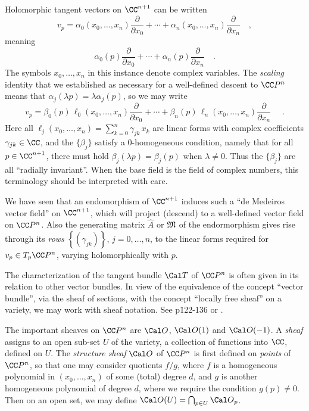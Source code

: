 Holomorphic tangent vectors on $\CC^{n+1}$ can be written
$$v_p = \alpha_0 \left(x_0,\dotsc, x_n\right) \frac{\partial}{\partial x_0} + \cdots + \alpha_n \left(x_0,\dotsc, x_n\right) \frac{\partial}{\partial x_n}\quad ,$$
meaning
$$\alpha_0(p) \frac{\partial}{\partial x_0}+\cdots + \alpha_n(p) \frac{\partial}{\partial x_n}\quad .$$
The symbols $x_0,\dotsc, x_n$ in this instance denote complex variables. The {\it scaling} identity that we established as necessary for a well-defined descent to $\CC P^n$ means that $\alpha_j (\lambda p) = \lambda \alpha_j(p)$, so we may write
$$v_p = \beta_0 (p)\, \ell_0 \left(x_0,\dotsc, x_n\right) \frac{\partial}{\partial x_0}+\cdots +
\beta_n (p)\, \ell_n \left(x_0,\dotsc, x_n\right) \frac{\partial}{\partial x_n}\,\,\quad .$$
Here all $\ell_j \left(x_0,\dotsc, x_n\right) = \sum_{k=0}^n \gamma_{jk}\, x_k$ are linear forms with complex coefficients $\gamma_{jk}\in \CC$, and the $\{\beta_j\}$ satisfy a 0-homogeneous condition, namely that for all $p \in \CC^{n+1}$, there must hold $\beta_j (\lambda p) = \beta_j (p)$ when $\lambda \ne 0$. Thus the $\{\beta_j\}$ are all ``radially invariant''. When the base field is the field of complex numbers, this terminology should be interpreted with care.


We have seen that an endomorphism of $\CC^{n+1}$ induces such a ``de Medeiros vector field'' on $\CC^{n+1}$, which will project (descend) to a well-defined vector field on $\CC P^n$. Also the generating matrix $\hat{A}$ or $\frak M$ of the endormorphism gives rise through its {\it rows} $\left\{\left(\gamma_{jk}\right)\right\}$, $j = 0,\dotsc, n$, to the linear forms required for $v_p \in T_p \CC P^n$, varying holomorphically with $p$.

The characterization of the tangent bundle ${\Cal T}$ of $\CC P^n$ is often given in its relation to other vector bundles. In view of the equivalence of the concept ``vector bundle'', via the sheaf of sections, with the concept ``locally free sheaf'' on a variety, we may work with sheaf notation. See \cite{Gathmann} p\. 122-136 or \cite{Huybrechts}.

The important sheaves on $\CC P^n$ are $\Cal O$, $\Cal O (1)$ and $\Cal O (-1)$. A {\it sheaf} assigns to an open sub-set $U$ of the variety, a collection of functions into $\CC$, defined on $U$. The {\it structure sheaf} $\Cal O$ of $\CC P^n$ is first defined on {\it points} of $\CC P^n$, so that one may consider quotients $f/g$, where $f$ is a homogeneous polynomial in $(x_0,\dotsc, x_n)$ of some (total) degree $d$, and $g$ is another homogeneous polynomial of degree $d$, where we require the condition $g(p) \ne 0$. Then on an open set, we may define
$\Cal O (U) = \bigcap_{p\in U}{\Cal O}_p$.

